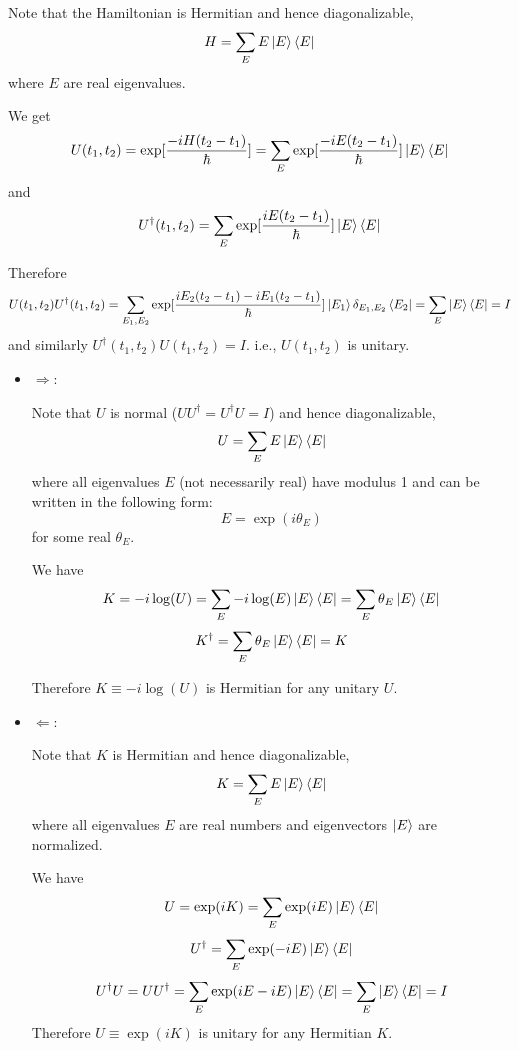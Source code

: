 \documentclass{homeworg}
\begin{document}
\exercise*
Note that the Hamiltonian is Hermitian and hence diagonalizable,
\[H=\sum_E E\ket{E}\bra{E}\]
where $E$ are real eigenvalues.

We get
\[U(t_1,t_2)=\exp[\frac{-iH(t_2-t_1)}\hbar]=\sum_E \exp[\frac{-iE(t_2-t_1)}{\hbar}]\ket{E}\bra{E}\]
and
\[U^\dagger(t_1,t_2)=\sum_E\exp[\frac{iE(t_2-t_1)}{\hbar}]\ket{E}\bra{E}\]

Therefore
\[U(t_1,t_2)U^\dagger(t_1,t_2)=\sum_{E_1,E_2}\exp[\frac{iE_2(t_2-t_1)-iE_1(t_2-t_1)}{\hbar}]\ket{E_1}\delta_{E_1,E_2}\bra{E_2}=\sum_E\ket{E}\bra{E}=I\]
and similarly $U^\dagger(t_1,t_2)U(t_1,t_2)=I$. i.e., $U(t_1,t_2)$ is unitary.

\exercise*
\begin{itemize}
    \item $\Rightarrow$:
    
    Note that $U$ is normal ($UU^\dagger=U^\dagger U=I$) and hence diagonalizable,
    \[U=\sum_E E\ket{E}\bra{E}\]
    where all eigenvalues $E$ (not necessarily real) have modulus 1 and can be written in the following form:
    \[E=\exp(i\theta_E)\]
    for some real $\theta_E$.
    
    
    We have
    \[K=-i\log(U)=\sum_E -i\log(E)\ket{E}\bra{E}=\sum_E \theta_E\ket{E}
    \bra{E}\]
    \[K^\dagger=\sum_E \theta_E\ket{E}\bra{E}=K\]
    
    Therefore $K\equiv-i\log(U)$ is Hermitian for any unitary $U$.
    \item $\Leftarrow$:
    
    Note that $K$ is Hermitian and hence diagonalizable,
    \[K=\sum_E E\ket{E}\bra{E}\]
    where all eigenvalues $E$ are real numbers and eigenvectors $\ket{E}$ are normalized.
    
    We have
    \[U=\exp(iK)=\sum_E \exp(iE)\ket{E}\bra{E}\]
    \[U^\dagger=\sum_E \exp(-iE)\ket{E}\bra{E}\]
    \[U^\dagger U=U U^\dagger=\sum_E \exp(iE-iE)\ket{E}\bra{E}=\sum_E\ket{E}\bra{E}=I\]
    Therefore $U\equiv \exp(iK)$ is unitary for any Hermitian $K$.
\end{itemize}
\end{document}
